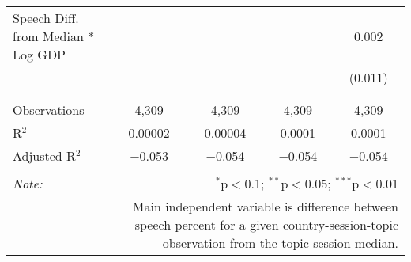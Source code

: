\begin{table}[!htbp]
\begin{tabular}{@{\extracolsep{5pt}}lcccc}
 Speech Diff. from Median * Log GDP &  &  &  & 0.002 \\ 
  &  &  &  & (0.011) \\ 
  & & & & \\ 
\hline \\[-1.8ex] 
Observations & 4,309 & 4,309 & 4,309 & 4,309 \\ 
R$^{2}$ & 0.00002 & 0.00004 & 0.0001 & 0.0001 \\ 
Adjusted R$^{2}$ & $-$0.053 & $-$0.054 & $-$0.054 & $-$0.054 \\ 
\hline 
\hline \\[-1.8ex] 
\textit{Note:}  & \multicolumn{4}{r}{$^{*}$p$<$0.1; $^{**}$p$<$0.05; $^{***}$p$<$0.01} \\ 
 & \multicolumn{4}{r}{Main independent variable is difference between speech percent for a given country-session-topic observation from the topic-session median.} \\ 
\end{tabular} 
\end{table} 
